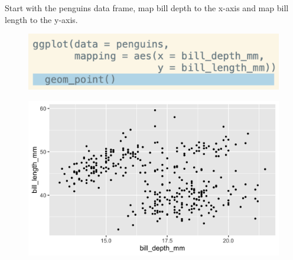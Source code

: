\documentclass[11pt]{beamer}
\begin{document}
		\begin{frame}
		

		Start with the penguins data frame, map bill depth to the x-axis and map bill length to the y-axis. 
		
		\begin{minipage}[t]{0.5\linewidth}
			\begin{figure}
				\centering
				\includegraphics[width=1\linewidth]{Images/S2/code/s9}
				
			\end{figure}
		\end{minipage}%
		\begin{minipage}[t]{0.5\linewidth}
			
			\begin{figure}
				\centering
				\includegraphics[width=1\linewidth]{Images/S2/penguins-3-1}
				
			\end{figure}
			
			
		\end{minipage}
		
	\end{frame}
\end{document}
